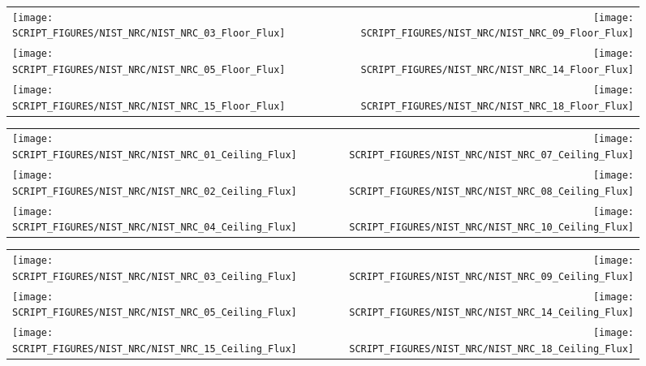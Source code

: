 \begin{figure}[!ht]
\begin{tabular*}{\textwidth}{l@{\extracolsep{\fill}}r}
\texttt{[image: SCRIPT\_FIGURES/NIST\_NRC/NIST\_NRC\_03\_Floor\_Flux]} &
\texttt{[image: SCRIPT\_FIGURES/NIST\_NRC/NIST\_NRC\_09\_Floor\_Flux]} \\
\texttt{[image: SCRIPT\_FIGURES/NIST\_NRC/NIST\_NRC\_05\_Floor\_Flux]} &
\texttt{[image: SCRIPT\_FIGURES/NIST\_NRC/NIST\_NRC\_14\_Floor\_Flux]} \\
\texttt{[image: SCRIPT\_FIGURES/NIST\_NRC/NIST\_NRC\_15\_Floor\_Flux]} &
\texttt{[image: SCRIPT\_FIGURES/NIST\_NRC/NIST\_NRC\_18\_Floor\_Flux]}
\end{tabular*}
\label{NIST_NRC_Floor_Flux_Open}
\end{figure}


\begin{figure}[!ht]
\begin{tabular*}{\textwidth}{l@{\extracolsep{\fill}}r}
\texttt{[image: SCRIPT\_FIGURES/NIST\_NRC/NIST\_NRC\_01\_Ceiling\_Flux]} &
\texttt{[image: SCRIPT\_FIGURES/NIST\_NRC/NIST\_NRC\_07\_Ceiling\_Flux]} \\
\texttt{[image: SCRIPT\_FIGURES/NIST\_NRC/NIST\_NRC\_02\_Ceiling\_Flux]} &
\texttt{[image: SCRIPT\_FIGURES/NIST\_NRC/NIST\_NRC\_08\_Ceiling\_Flux]} \\
\texttt{[image: SCRIPT\_FIGURES/NIST\_NRC/NIST\_NRC\_04\_Ceiling\_Flux]} &
\texttt{[image: SCRIPT\_FIGURES/NIST\_NRC/NIST\_NRC\_10\_Ceiling\_Flux]}
\end{tabular*}
\label{NIST_NRC_Ceiling_Flux_Closed}
\end{figure}

\begin{figure}[!ht]
\begin{tabular*}{\textwidth}{l@{\extracolsep{\fill}}r}
\texttt{[image: SCRIPT\_FIGURES/NIST\_NRC/NIST\_NRC\_03\_Ceiling\_Flux]} &
\texttt{[image: SCRIPT\_FIGURES/NIST\_NRC/NIST\_NRC\_09\_Ceiling\_Flux]} \\
\texttt{[image: SCRIPT\_FIGURES/NIST\_NRC/NIST\_NRC\_05\_Ceiling\_Flux]} &
\texttt{[image: SCRIPT\_FIGURES/NIST\_NRC/NIST\_NRC\_14\_Ceiling\_Flux]} \\
\texttt{[image: SCRIPT\_FIGURES/NIST\_NRC/NIST\_NRC\_15\_Ceiling\_Flux]} &
\texttt{[image: SCRIPT\_FIGURES/NIST\_NRC/NIST\_NRC\_18\_Ceiling\_Flux]}
\end{tabular*}
\label{NIST_NRC_Ceiling_Flux_Open}
\end{figure}

